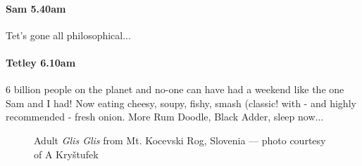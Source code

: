 \paragraph{Sam 5.40am}
Tet’s gone all philosophical...


\paragraph{Tetley 6.10am}
6 billion people on the planet and no-one can have had a weekend like the one Sam and I had! Now eating cheesy, soupy, fishy, smash (classic! with - and highly recommended - fresh onion. More Rum Doodle, Black Adder, sleep now...

\begin{figure}[t!]
\checkoddpage \ifoddpage \forcerectofloat \else \forceversofloat \fi
\centering
{}
\caption{Adult \emph{Glis Glis} from Mt. Kocevski Rog, Slovenia --- photo courtesy of A Kry\v{s}tufek  }
\label{the creature}
\end{figure}

